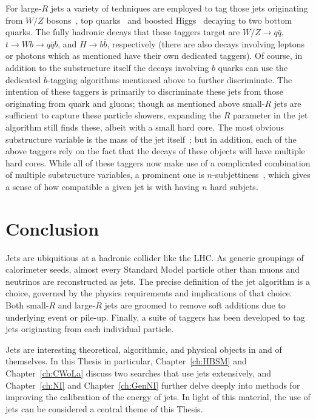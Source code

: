 For large-$R$ jets a variety of techniques are employed to tag those jets originating from $W/Z$ bosons~\cite{ATL-PHYS-PUB-2014-004,Aad:2015rpa,Aaboud:2018psm}, top quarks~\cite{Aad:2016pux,Aaboud:2018psm} and boosted Higgs~\cite{Aad:2019uoz} decaying to two bottom quarks.
The fully hadronic decays that these taggers target are $W/Z\rightarrow q\bar{q}$, $t\rightarrow Wb \rightarrow q\bar{q} b$, and $H\rightarrow b\bar{b}$, respectively (there are also decays involving leptons or photons which as mentioned have their own dedicated taggers).
Of course, in addition to the substructure itself the decays involving $b$ quarks can use the dedicated $b$-tagging algorithms mentioned above to further discriminate.
The intention of these taggers is primarily to discriminate these jets from those originating from quark and gluons; though as mentioned above small-$R$ jets are sufficient to capture these particle showers, expanding the $R$ parameter in the jet algorithm still finds these, albeit with a small hard core.
The most obvious substructure variable is the mass of the jet itself~\cite{ATLAS-CONF-2016-035}; but in addition, each of the above taggers rely on the fact that the decays of these objects will have multiple hard cores.
While all of these taggers now make use of a complicated combination of multiple substructure variables, a prominent one is $n$-subjettiness~\cite{Thaler:2010tr}, which gives a sense of how compatible a given jet is with having $n$ hard subjets.

\section{Conclusion}
\label{sec:jets:conclusion}
Jets are ubiquitious at a hadronic collider like the LHC.
As generic groupings of calorimeter seeds, almost every Standard Model particle other than muons and neutrinos are reconstructed as jets.
The precise definition of the jet algorithm is a choice, governed by the physics requirements and implications of that choice.
Both small-$R$ and large-$R$ jets are groomed to remove soft additions due to underlying event or pile-up.
Finally, a suite of taggers has been developed to tag jets originating from each individual particle.

Jets are interesting theoretical, algorithmic, and physical objects in and of themselves.
In this Thesis in particular, Chapter~\ref{ch:HBSM} and Chapter~\ref{ch:CWoLa} discuss two searches that use jets extensively, and Chapter~\ref{ch:NI} and Chapter~\ref{ch:GenNI} further delve deeply into methods for improving the calibration of the energy of jets.
In light of this material, the use of jets can be considered a central theme of this Thesis.
